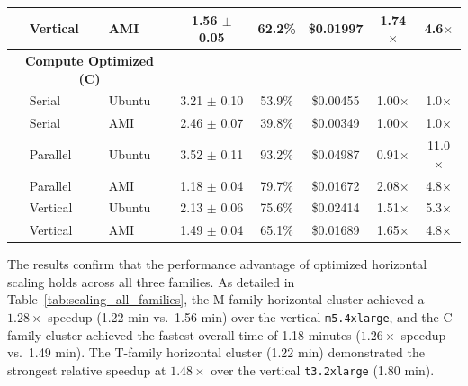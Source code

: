 \documentclass[conference]{IEEEtran}
\begin{document}
\begin{table}[!htbp]
{\begin{tabular}{lll*{5}{c}}
& Vertical & AMI    & 1.56 $\pm$ 0.05 & 62.2\% & \$0.01997 & 1.74$\times$ & 4.6$\times$ \\
\midrule
\multicolumn{3}{c}{\textbf{Compute Optimized (C)}} \\
& Serial   & Ubuntu & 3.21 $\pm$ 0.10 & 53.9\% & \$0.00455 & 1.00$\times$ & 1.0$\times$ \\
& Serial   & AMI    & 2.46 $\pm$ 0.07 & 39.8\% & \$0.00349 & 1.00$\times$ & 1.0$\times$ \\
& Parallel & Ubuntu & 3.52 $\pm$ 0.11 & 93.2\% & \$0.04987 & 0.91$\times$ & 11.0$\times$ \\
& Parallel & AMI    & 1.18 $\pm$ 0.04 & 79.7\% & \$0.01672 & 2.08$\times$ & 4.8$\times$ \\
& Vertical & Ubuntu & 2.13 $\pm$ 0.06 & 75.6\% & \$0.02414 & 1.51$\times$ & 5.3$\times$ \\
& Vertical & AMI    & 1.49 $\pm$ 0.04 & 65.1\% & \$0.01689 & 1.65$\times$ & 4.8$\times$ \\
\bottomrule
\end{tabular}%
}
\end{table}

The results confirm that the performance advantage of optimized horizontal
scaling holds across all three families. As detailed in
Table~\ref{tab:scaling_all_families}, the M-family horizontal cluster achieved
a $1.28\times$ speedup (1.22 min vs.\ 1.56 min) over the vertical
\texttt{m5.4xlarge}, and the C-family cluster achieved the fastest overall time
of 1.18 minutes ($1.26\times$ speedup vs.\ 1.49 min). The T-family horizontal
cluster (1.22 min) demonstrated the strongest relative speedup at $1.48\times$
over the vertical \texttt{t3.2xlarge} (1.80 min).
\end{document}
